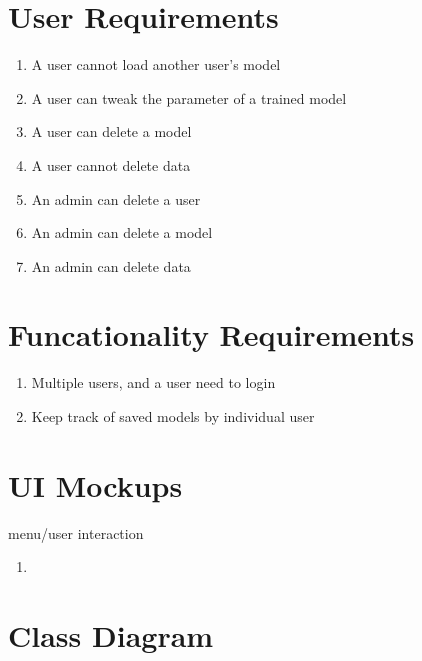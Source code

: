 \documentclass[11pt]{article}
\begin{document}
\section{User Requirements}
\begin{enumerate}[leftmargin=4\parindent]
 \item A user cannot load another user's model
 \item A user can tweak the parameter of a trained model
 \item A user can delete a model
 \item A user cannot delete data
 \item An admin can delete a user
 \item An admin can delete a model
 \item An admin can delete data
\end{enumerate}

\section{Funcationality Requirements}
\begin{enumerate}[leftmargin=4\parindent]
 \item Multiple users, and a user need to login
 \item Keep track of saved models by individual user
\end{enumerate}

\section{UI Mockups}
menu/user interaction
\begin{enumerate}[leftmargin=4\parindent]
 \item 
\end{enumerate}

\section{Class Diagram}


\end{document}
